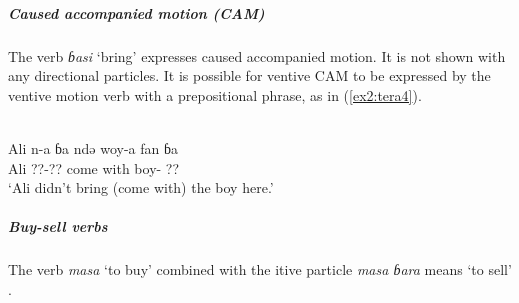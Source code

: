 \subparagraph{Caused accompanied motion (CAM)}

The verb \textit{ɓasi} `bring' expresses caused accompanied motion. It is not shown with any directional particles. It is possible for ventive CAM to be expressed by the ventive motion verb with a prepositional phrase, as in (\ref{ex2:tera4}). 

\ea\label{ex2:tera4}
 \\
\gll Ali n-a ɓa ndə woy-a fan ɓa \\
Ali ??-?? come with boy- ??  \\
\glt `Ali didn't bring (come with) the boy here.'
\z 

\subparagraph{Buy-sell verbs}

The verb \textit{masa} `to buy' combined with the itive particle \textit{masa ɓara} means `to sell' \citep[19]{newmanGrammarTeraTransformational1970}.
